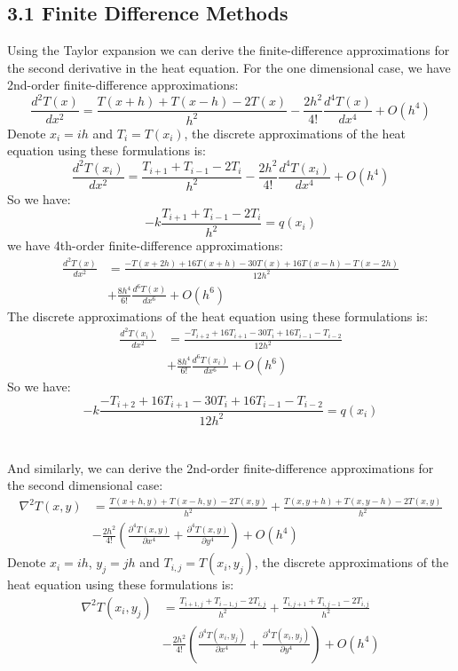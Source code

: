 \documentclass{article}
\begin{document}
\subsection*{3.1 Finite Difference Methods}
Using the Taylor expansion we can derive the finite-difference approximations for the second derivative
in the heat equation. For the one dimensional case, we have 2nd-order finite-difference approximations:
\[
\frac{d^2 T(x)}{dx^2} = \frac{T(x+h) + T(x-h) - 2T(x)}{h^2} - \frac{2h^2}{4!}\frac{d^4 T(x)}{dx^4} + O(h^4)
\]
Denote $x_i = ih$ and $T_i = T(x_i)$, the discrete approximations of the heat equation using these formulations is:
\[
\frac{d^2 T(x_i)}{dx^2} = \frac{T_{i+1} + T_{i-1} - 2T_i}{h^2} - \frac{2h^2}{4!}\frac{d^4 T(x_i)}{dx^4} + O(h^4)
\]
So we have:
\[
-k\frac{T_{i+1} + T_{i-1} - 2T_i}{h^2} = q(x_i)
\]
we have 4th-order finite-difference approximations:
\[
\begin{split}
\frac{d^2 T(x)}{dx^2} &= \frac{- T(x+2h) + 16T(x+h) - 30T(x) + 16T(x-h) - T(x-2h)}{12h^2}\\
                                 &+ \frac{8h^4}{6!}\frac{d^6 T(x)}{dx^6} + O(h^6)
\end{split}
\]
The discrete approximations of the heat equation using these formulations is:
\[
\begin{split}
\frac{d^2 T(x_i)}{dx^2} &= \frac{- T_{i+2} + 16T_{i+1} - 30T_i + 16T_{i-1} - T_{i-2}}{12h^2}\\
                                    &+ \frac{8h^4}{6!}\frac{d^6 T(x_i)}{dx^6} + O(h^6)
\end{split}
\]
So we have:
\[
-k\frac{- T_{i+2} + 16T_{i+1} - 30T_i + 16T_{i-1} - T_{i-2}}{12h^2} = q(x_i)
\]\\ \\
And similarly, we can derive  the 2nd-order finite-difference approximations for the second dimensional case:
\[
\begin{split}
{\nabla}^2{T(x, y)} &= \frac{T(x+h, y) + T(x-h, y) - 2T(x, y)}{h^2} + \frac{T(x, y+h) + T(x, y-h) - 2T(x, y)}{h^2}\\ 
                             &- \frac{2h^2}{4!}(\frac{\partial^4 T(x, y)}{\partial x^4} + \frac{\partial^4 T(x, y)}{\partial y^4}) + O(h^4)
\end{split}
\]
Denote $x_i = ih$, $y_j = jh$ and $T_{i, j} = T(x_i, y_j)$, the discrete approximations of the heat equation using these formulations is:
\[
\begin{split}
{\nabla}^2{T(x_i, y_j)} &= \frac{T_{i+1,j} + T_{i-1,j} - 2T_{i, j}}{h^2} + \frac{T_{i, j+1} + T_{i, j-1} - 2T_{i, j}}{h^2}\\ 
                             &- \frac{2h^2}{4!}(\frac{\partial^4 T(x_i, y_j)}{\partial x^4} + \frac{\partial^4 T(x_i, y_j)}{\partial y^4}) + O(h^4)
\end{split}
\]
\end{document}
